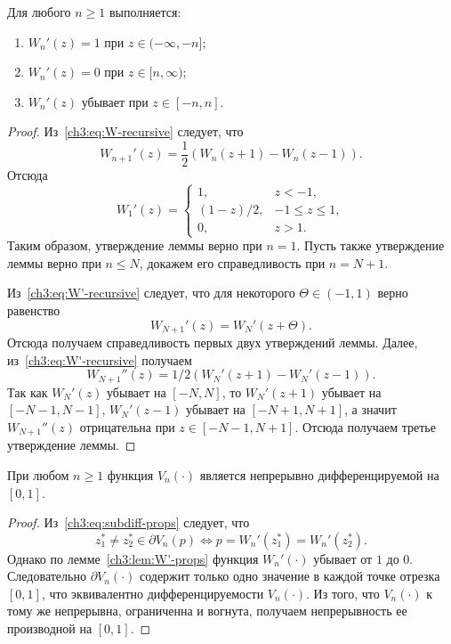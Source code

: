 {\begin{lemma}\label{ch3:lem:W'-props}
  Для любого $n \geqslant 1$ выполняется\textnormal{:}
  \begin{enumerate}
  \item $W_n'(z) = 1$ при $z \in (-\infty, -n];$
  \item $W_n'(z) = 0$ при $z \in [n, \infty);$
  \item $W_n'(z)$ убывает при $z \in [-n, n].$
  \end{enumerate}
\end{lemma}
\begin{proof}
  Из~\eqref{ch3:eq:W-recursive} следует, что
  \begin{equation}\label{ch3:eq:W'-recursive}
    W_{n+1}'(z) = \frac{1}{2} \left( W_n(z + 1) - W_n(z - 1) \right).
  \end{equation}
  Отсюда
  \begin{equation}\label{ch3:eq:W1'}
    W_1'(z) =
    \begin{cases}
      1, &z < -1, \\
      (1-z)/2,  &-1 \leqslant z \leqslant 1, \\
      0, &z > 1.
    \end{cases}
  \end{equation}
  Таким образом, утверждение леммы верно при $n = 1$.
  Пусть также утверждение леммы верно при $n \leqslant N$, докажем его справедливость при $n = N + 1$.

  Из~\eqref{ch3:eq:W'-recursive} следует, что для некоторого $\Theta \in (-1,1)$ верно равенство
  \[
    W_{N+1}'(z) = W_{N}'(z + \Theta).
  \]
  Отсюда получаем справедливость первых двух утверждений леммы.
  Далее, из~\eqref{ch3:eq:W'-recursive} получаем 
  \[
    W_{N+1}''(z) = 1/2 \left( W_{N}'(z + 1) - W_{N}'(z - 1) \right).
  \]
  Так как $W_N'(z)$ убывает на $[-N, N]$, то $W_N'(z + 1)$ убывает на $[-N-1, N - 1]$, $W_N'(z - 1)$ убывает на $[-N + 1, N+1]$, а значит $W_{N+1}''(z)$ отрицательна при $z \in [-N-1, N+1]$.
  Отсюда получаем третье утверждение леммы.
\end{proof}

\begin{proposition}
  При любом $n \geqslant 1$ функция $V_n(\cdot)$ является непрерывно дифференцируемой на $[0, 1]$.
\end{proposition}
\begin{proof}
  Из~\eqref{ch3:eq:subdiff-props} следует, что
  \begin{equation*}
    z_1^* \neq z_2^* \in \partial V_n(p) \iff p = W_n'(z_1^*) = W_n'(z_2^*).
  \end{equation*}
  Однако по лемме~\ref{ch3:lem:W'-props} функция $W_n'(\cdot)$ убывает от $1$ до $0$.
  Следовательно $\partial V_n(\cdot)$ содержит только одно значение в каждой точке отрезка $[0, 1]$, что эквивалентно дифференцируемости $V_n(\cdot)$.
  Из того, что $V_n(\cdot)$ к тому же непрерывна, ограниченна и вогнута, получаем непрерывность ее производной на $[0, 1]$.
\end{proof}

}

